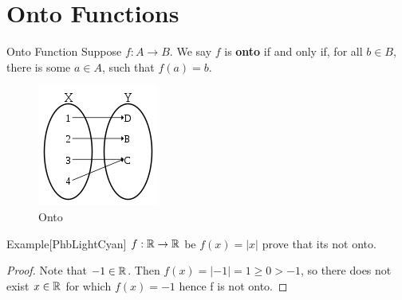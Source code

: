 \documentclass[../MATH-2000-Notes.tex]{subfiles}
\begin{document}
\section{Onto Functions}
\begin{Definition}
    {Onto Function}
    Suppose $f \colon A \to B$. We say $f$ is \textbf{onto} if and only if, for all $b \in B$, there is some $a \in A$, such that $f(a) = b$.
\end{Definition}
\begin{figure}[h]
    \centering
    \includegraphics[width=0.6\columnwidth]{../Assets/150px-Surjection.svg.png}
    \caption{Onto}
    \label{fig:onto}
\end{figure}

\begin{commentbox}{Example}[{PhbLightCyan}]
    \(f:\mathbb{R}\rightarrow \mathbb{R}\) be \(f(x) =  |x|\) prove that its not onto.
\end{commentbox}
\begin{proof}
    Note that \(-1 \in \mathbb{R}\). Then \(f(x) = |-1| = 1 \geq 0 > -1\), so there does not exist \(x \in \mathbb{R}\) for which \(f(x) = -1\) hence f is not onto.
\end{proof}
\end{document}
